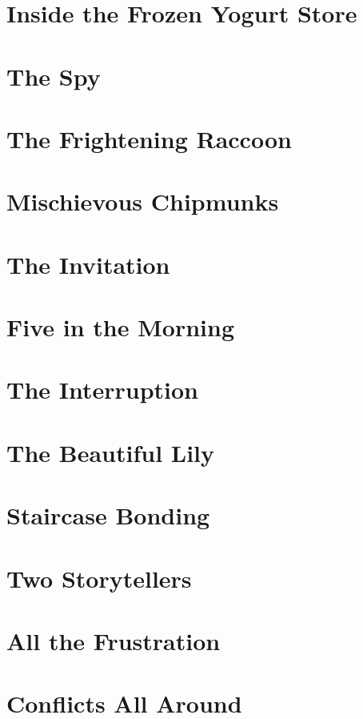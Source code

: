 \documentclass[smalldemyvopaper,11pt,twoside,onecolumn,openright,extrafontsizes]{memoir}
\begin{document}
\chapter{Inside the Frozen Yogurt Store}

\chapter{The Spy}

\chapter{The Frightening Raccoon}

\chapter{Mischievous Chipmunks}

\chapter{The Invitation}

\chapter{Five in the Morning}

\chapter{The Interruption}

\chapter{The Beautiful Lily}

\chapter{Staircase Bonding}

\chapter{Two Storytellers}

\chapter{All the Frustration}

\chapter{Conflicts All Around}




\end{document}
